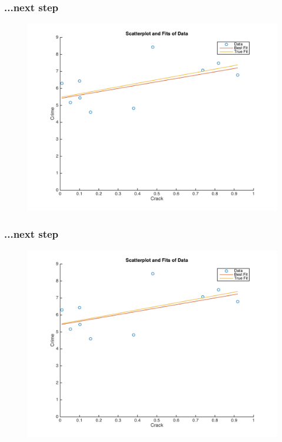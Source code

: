 \documentclass{beamer}
\begin{document}
\begin{frame}
\frametitle[alignment=center]{...next step}
\begin{figure}
\centering
\includegraphics[scale=0.5]{Newton_OLS_Figure_18.png}
\end{figure}
\end{frame}

\begin{frame}
\frametitle[alignment=center]{...next step}
\begin{figure}
\centering
\includegraphics[scale=0.5]{Newton_OLS_Figure_19.png}
\end{figure}
\end{frame}
\end{document}
